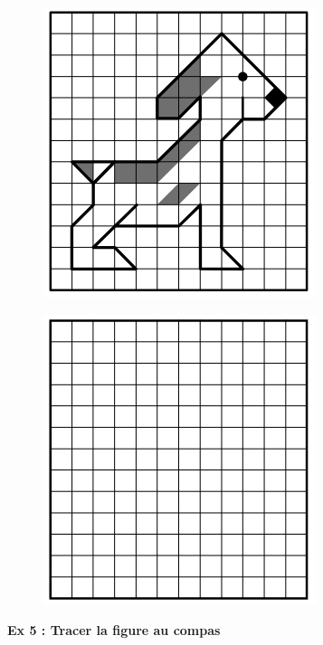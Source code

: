 \begin{multicols}{2} 
\begin{figure}[H]
  \centering
  \includegraphics[width=0.6\linewidth]{6x4-symetrie/ex4a.png}
\end{figure}

\begin{figure}[H]
  \centering
  \includegraphics[width=0.6\linewidth]{6x4-symetrie/ex4b.png}
\end{figure}
\end{multicols}

\newpage
\textbf{Ex 5 : Tracer la figure au compas}

